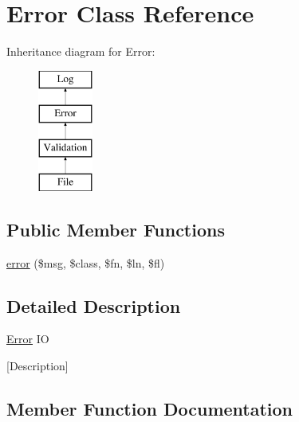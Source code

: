 \hypertarget{class_w_a_f_f_l_e_1_1_framework_1_1_i_o_1_1_error}{}\section{Error Class Reference}
\label{class_w_a_f_f_l_e_1_1_framework_1_1_i_o_1_1_error}
Inheritance diagram for Error\+:\begin{figure}[H]
\begin{center}
\leavevmode
\includegraphics[height=4.000000cm]{class_w_a_f_f_l_e_1_1_framework_1_1_i_o_1_1_error}
\end{center}
\end{figure}
\subsection*{Public Member Functions}
\begin{DoxyCompactItemize}
\item 
\hyperlink{class_w_a_f_f_l_e_1_1_framework_1_1_i_o_1_1_error_af721dfe2b0cca44a3c68c6fda1439165}{error} (\$msg, \$class, \$fn, \$ln, \$fl)
\end{DoxyCompactItemize}


\subsection{Detailed Description}
\hyperlink{class_w_a_f_f_l_e_1_1_framework_1_1_i_o_1_1_error}{Error} IO

\mbox{[}Description\mbox{]} 

\subsection{Member Function Documentation}
\mbox{\label{class_w_a_f_f_l_e_1_1_framework_1_1_i_o_1_1_error_af721dfe2b0cca44a3c68c6fda1439165}} 
